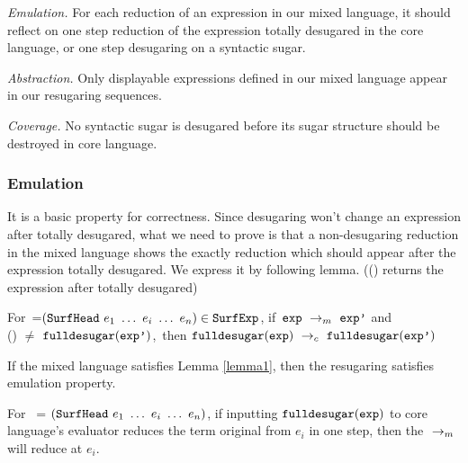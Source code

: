 \emph{Emulation.} For each reduction of an expression in our mixed language, it should reflect on one step reduction of the expression totally desugared in the core language, or one step desugaring on a syntactic sugar.

\emph{Abstraction.} Only displayable expressions defined in our mixed language appear in our resugaring sequences.

\emph{Coverage.} No syntactic sugar is desugared before its sugar structure should be destroyed in core language.

\subsubsection{Emulation} It is a basic property for correctness. Since desugaring won't change an expression after totally desugared, what we need to prove is that a non-desugaring reduction in the mixed language shows the exactly reduction which should appear after the expression totally desugared. We express it by following lemma. (() returns the expression after  totally desugared)

\begin{lemma}
\label{lemma1}

For~=$(\mbox{\tt SurfHead}~e_1~\ldots~e_i~\ldots~e_n)\in\mbox{\tt SurfExp}$, if~$\mbox{\tt exp} ~\rightarrow_m~\mbox{\tt exp'}$ and\\ () $\not=$ $\mbox{\tt fulldesugar}(\mbox{\tt exp'})$,~then $\mbox{\tt fulldesugar}(\mbox{\tt exp}) ~\rightarrow_c~\mbox{\tt fulldesugar}(\mbox{\tt exp'})$

\end{lemma}

\begin{Def}[Emulation]
If the mixed language satisfies Lemma \ref{lemma1}, then the resugaring satisfies emulation property.
\end{Def}

\begin{lemma}
\label{lemma2}

For~ = $(\mbox{\tt SurfHead}~e_1~\ldots~e_i~\ldots~e_n)$, if inputting $\mbox{\tt fulldesugar}(\mbox{\tt exp})$ to core language's evaluator reduces the term original from $e_i$ in one step, then the $~\rightarrow_m~$ will reduce  at $e_i$.

\end{lemma}

